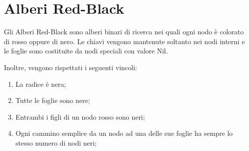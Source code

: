 \section{Alberi Red-Black}
\begin{definition}
    Gli Alberi Red-Black sono alberi binari di ricerca nei quali ogni nodo è
    colorato di rosso oppure di nero. Le chiavi vengono mantenute soltanto nei
    nodi interni e le foglie sono costituite da nodi speciali con valore Nil.

    Inoltre, vengono rispettati i seguenti vincoli:
    \begin{enumerate}
        \item La radice è nera;
        \item Tutte le foglie sono nere;
        \item Entrambi i figli di un nodo rosso sono neri;
        \item Ogni cammino semplice da un nodo ad una delle sue foglie ha sempre
        lo stesso numero di nodi neri;
    \end{enumerate}
\end{definition}

